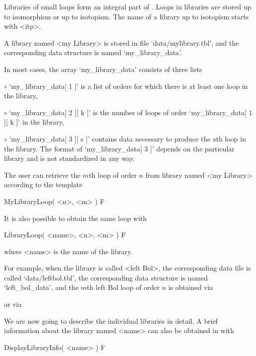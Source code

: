 
\label{lib} Libraries of small loops form an integral part of {\LOOPS}. Loops
in libraries are stored up to isomorphism or up to isotopism. The name of a
library up to isotopism starts with <itp>.


A library named <my Library> is stored in file `data/mylibrary.tbl', and the
corresponding data structure is named `my_library_data'.

In most cases, the array `my_library_data' consists of three lists
\beginlist%
\item{$\circ$}
    `my_library_data[ 1 ]' is a list of orders for which there is at
    least one loop in the library,
\item{$\circ$}
    `my_library_data[ 2 ][ k ]' is the number of loops of order
    `my_library_data[ 1 ][ k ]' in the library,
\item{$\circ$}
    `my_library_data[ 3 ][ s ]' contains data necessary to produce the
    $s$th loop in the library.
\endlist
The format of `my_library_data[ 3 ]' depends on the particular library and is
not standardized in any way.

The user can retrieve the $m$th loop of order $n$ from library named <my
Library> according to the template

\>MyLibraryLoop( <n>, <m> ) F

It is also possible to obtain the same loop with

\>LibraryLoop( <name>, <n>, <m> ) F

where <name> is the name of the library.

For example, when the library is called <left Bol>, the corresponding data file
is called `data/leftbol.tbl', the corresponding data structure is named
`left_bol_data', and the $m$th left Bol loop of order $n$ is obtained via


or via


We are now going to describe the individual libraries in detail. A brief
information about the library named <name> can also be obtained in {\LOOPS}
with

\>DisplayLibraryInfo( <name> ) F


